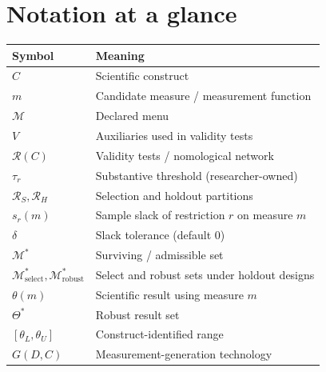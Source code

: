 \documentclass[10pt,letterpaper]{article}
\newcommand{\M}{\ensuremath{\mathcal{M}}}
\newcommand{\Rset}{\mathcal{R}}
\begin{document}
\section{Notation at a glance}
\label{app:notation}
\begin{center}
\small
\begin{tabular}{@{}ll@{}}
\toprule
Symbol & Meaning \\
\midrule
$C$ & Scientific construct \\
$m$ & Candidate measure / measurement function \\
$\M$ & Declared menu \\
$V$ & Auxiliaries used in validity tests \\
$\Rset(C)$ & Validity tests / nomological network \\
$\tau_r$ & Substantive threshold (researcher-owned) \\
$\Rset_S,\Rset_H$ & Selection and holdout partitions \\
$s_r(m)$ & Sample slack of restriction $r$ on measure $m$ \\
$\delta$ & Slack tolerance (default $0$) \\
$\M^*$ & Surviving / admissible set \\
$\M^*_{\mathrm{select}},\M^*_{\mathrm{robust}}$ & Select and robust sets under holdout designs \\
$\theta(m)$ & Scientific result using measure $m$ \\
$\Theta^*$ & Robust result set \\
$[\theta_L,\theta_U]$ & Construct-identified range \\
$G(D,C)$ & Measurement-generation technology \\
\bottomrule
\end{tabular}
\end{center}
\end{document}
